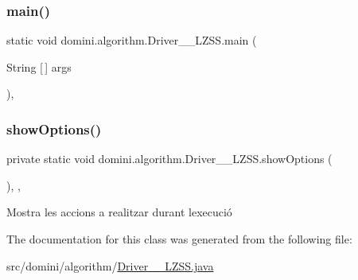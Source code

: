 \subsubsection{\texorpdfstring{main()}{main()}}
{\footnotesize\ttfamily static void domini.\+algorithm.\+Driver\+\_\+\+\_\+\+L\+Z\+S\+S.\+main (\begin{DoxyParamCaption}\item[{String \mbox{[}$\,$\mbox{]}}]{args }\end{DoxyParamCaption})\hspace{0.3cm}{\ttfamily [inline]}, {\ttfamily [static]}}

\mbox{\label{classdomini_1_1algorithm_1_1Driver____LZSS_a4362a21690fbdb3ef42dd6f8ca0f0da6}} 
\subsubsection{\texorpdfstring{show\+Options()}{showOptions()}}
{\footnotesize\ttfamily private static void domini.\+algorithm.\+Driver\+\_\+\+\_\+\+L\+Z\+S\+S.\+show\+Options (\begin{DoxyParamCaption}{ }\end{DoxyParamCaption})\hspace{0.3cm}{\ttfamily [inline]}, {\ttfamily [static]}, {\ttfamily [private]}}



Mostra les accions a realitzar durant l\textquotesingle{}execució 



The documentation for this class was generated from the following file\+:\begin{DoxyCompactItemize}
\item 
src/domini/algorithm/\hyperlink{Driver____LZSS_8java}{Driver\+\_\+\+\_\+\+L\+Z\+S\+S.\+java}\end{DoxyCompactItemize}
